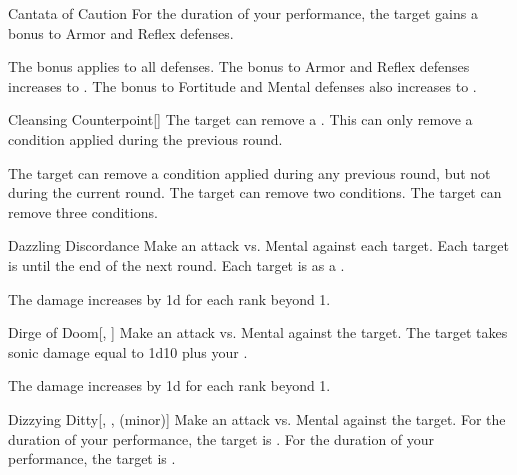 {\begin{freeability}{Cantata of Caution}
                For the duration of your performance, the target gains a  bonus to Armor and Reflex defenses.

                \rankline
                 The bonus applies to all defenses.
                 The bonus to Armor and Reflex defenses increases to .
                 The bonus to Fortitude and Mental defenses also increases to .
            \end{freeability}

            \begin{freeability}{Cleansing Counterpoint}[]
                The target can remove a .
                This can only remove a condition applied during the previous round.

                \rankline
                 The target can remove a condition applied during any previous round, but not during the current round.
                 The target can remove two conditions.
                 The target can remove three conditions.
            \end{freeability}

            \begin{freeability}{Dazzling Discordance}
                Make an attack vs. Mental against each target.
                \hit Each target is  until the end of the next round.
                \crit Each target is  as a .

                \rankline
                The damage increases by \plus1d for each rank beyond 1.
            \end{freeability}

            \begin{freeability}{Dirge of Doom}[, ]
                Make an attack vs. Mental against the target.
                \hit The target takes sonic damage equal to 1d10 plus your .

                \rankline
                The damage increases by \plus1d for each rank beyond 1.
            \end{freeability}

            \begin{freeability}{Dizzying Ditty}[, ,  (minor)]
                Make an attack vs. Mental against the target.
                \hit For the duration of your performance, the target is .
                \crit For the duration of your performance, the target is .


\end{freeability}}

